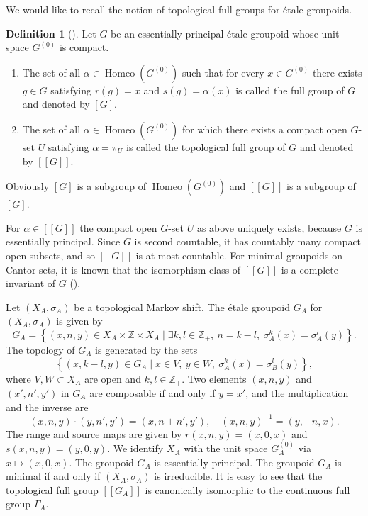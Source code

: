 \documentclass[11pt]{article}
\theoremstyle{definition}
\newtheorem{definition}[theorem]{Definition}
\numberwithin{equation}{section}
\newcommand{\Homeo}{\operatorname{Homeo}}
\newcommand{\Z}{\mathbb{Z}}
\begin{document}
We would like to recall 
the notion of topological full groups for \'etale groupoids. 

\begin{definition}[{\cite[Definition 2.3]{Matui12PLMS}}]
Let $G$ be an essentially principal \'etale groupoid 
whose unit space $G^{(0)}$ is compact. 
\begin{enumerate}
\item The set of all $\alpha\in\Homeo(G^{(0)})$ such that 
for every $x\in G^{(0)}$ there exists $g\in G$ 
satisfying $r(g)=x$ and $s(g)=\alpha(x)$ 
is called the full group of $G$ and denoted by $[G]$. 
\item The set of all $\alpha\in\Homeo(G^{(0)})$ for which 
there exists a compact open $G$-set $U$ satisfying $\alpha=\pi_U$ 
is called the topological full group of $G$ and denoted by $[[G]]$. 
\end{enumerate}
Obviously $[G]$ is a subgroup of $\Homeo(G^{(0)})$ and 
$[[G]]$ is a subgroup of $[G]$. 
\end{definition}

For $\alpha\in[[G]]$ the compact open $G$-set $U$ as above uniquely exists, 
because $G$ is essentially principal. 
Since $G$ is second countable, it has countably many compact open subsets, 
and so $[[G]]$ is at most countable. 
For minimal groupoids on Cantor sets, 
it is known that the isomorphism class of $[[G]]$ is 
a complete invariant of $G$ (\cite[Theorem 3.10]{Matui12}). 

Let $(X_A,\sigma_A)$ be a topological Markov shift. 
The \'etale groupoid $G_A$ for $(X_A,\sigma_A)$ is given by 
\[
G_A=\left\{(x,n,y)\in X_A\times\Z\times X_A\mid
\exists k,l\in\Z_+,\ n=k{-}l,\ \sigma_A^k(x)=\sigma_A^l(y)\right\}. 
\]
The topology of $G_A$ is generated by the sets 
\[
\left\{(x,k{-}l,y)\in G_A
\mid x\in V,\ y\in W,\ \sigma_A^k(x)=\sigma_B^l(y)\right\}, 
\]
where $V,W\subset X_A$ are open and $k,l\in\Z_+$. 
Two elements $(x,n,y)$ and $(x',n',y')$ in $G_A$ are composable 
if and only if $y=x'$, and the multiplication and the inverse are 
\[
(x,n,y)\cdot(y,n',y')=(x,n{+}n',y'),\quad (x,n,y)^{-1}=(y,-n,x). 
\]
The range and source maps are given 
by $r(x,n,y)=(x,0,x)$ and $s(x,n,y)=(y,0,y)$. 
We identify $X_A$ with the unit space $G_A^{(0)}$ via $x\mapsto(x,0,x)$. 
The groupoid $G_A$ is essentially principal. 
The groupoid $G_A$ is minimal if and only if 
$(X_A,\sigma_A)$ is irreducible. 
It is easy to see that 
the topological full group $[[G_A]]$ is canonically isomorphic to 
the continuous full group $\Gamma_A$. 
\end{document}
